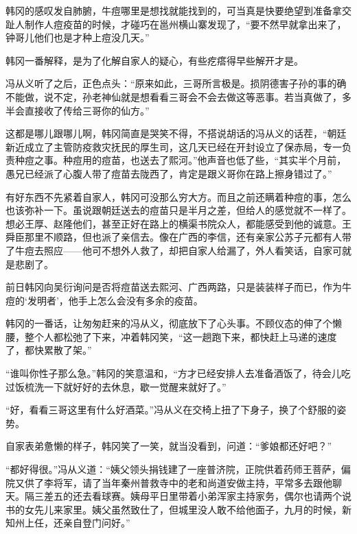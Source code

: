 韩冈的感叹发自肺腑，牛痘哪里是想找就能找到的，可当真是快要绝望到准备拿交趾人制作人痘疫苗的时候，才碰巧在邕州横山寨发现了，“要不然早就拿出来了，钟哥儿他们也是才种上痘没几天。”

韩冈一番解释，是为了化解自家人的疑心，有些疙瘩得早些解开才是。

冯从义听了之后，正色点头：“原来如此，三哥所言极是。损阴德害子孙的事的确不能做，说不定，孙老神仙就是想看看三哥会不会去做这等恶事。若当真做了，多半会直接收了传给三哥你的仙方。”

这都是哪儿跟哪儿啊，韩冈简直是哭笑不得，不搭说胡话的冯从义的话茬，“朝廷新近成立了主管防疫救灾抚民的厚生司，这几天已经在开封设立了保赤局，专一负责种痘之事。种痘用的痘苗，也送去了熙河。”他声音也低了些，“其实半个月前，愚兄已经派了心腹人带了痘苗去陇西了，肯定是跟义哥你在路上擦身错过了。”

有好东西不先紧着自家人，韩冈可没那么穷大方。而且之前还瞒着种痘的事，怎么也该弥补一下。虽说跟朝廷送去的痘苗只是半月之差，但给人的感觉就不一样了。想必王厚、赵隆他们，甚至正好在路上的横渠书院众人，都能感受到他的诚意。王舜臣那里不顺路，但也派了亲信去。像在广西的李信，还有亲家公苏子元都有人带了牛痘去照应——他可不想外人救了，却把自家人给漏了，外人看笑话，自家可就是悲剧了。

前日韩冈向吴衍询问是否将痘苗送去熙河、广西两路，只是装装样子而已，作为牛痘的‘发明者’，他手上怎么会没有多余的疫苗。

韩冈的一番话，让匆匆赶来的冯从义，彻底放下了心头事。不顾仪态的伸了个懒腰，整个人都松弛了下来，冲着韩冈笑，“这一趟跑下来，都快赶上马递的速度了，都快累散了架。”

“谁叫你性子那么急。”韩冈的笑意温和，“方才已经安排人去准备酒饭了，待会儿吃过饭梳洗一下就好好的去休息，歇一觉醒来就好了。”

“好，看看三哥这里有什么好酒菜。”冯从义在交椅上扭了下身子，换了个舒服的姿势。

自家表弟惫懒的样子，韩冈笑了一笑，就当没看到，问道：“爹娘都还好吧？”

“都好得很。”冯从义道：“姨父领头捐钱建了一座普济院，正院供着药师王菩萨，偏院又供了李将军，请了当年秦州普救寺中的老和尚道安做主持，平常多去跟他聊天。隔三差五的还去看球赛。姨母平日里带着小弟浑家主持家务，偶尔也请两个说书的女先儿来家里。姨父虽然致仕了，但城里没人敢不给他面子，九月的时候，新知州上任，还亲自登门问好。”

